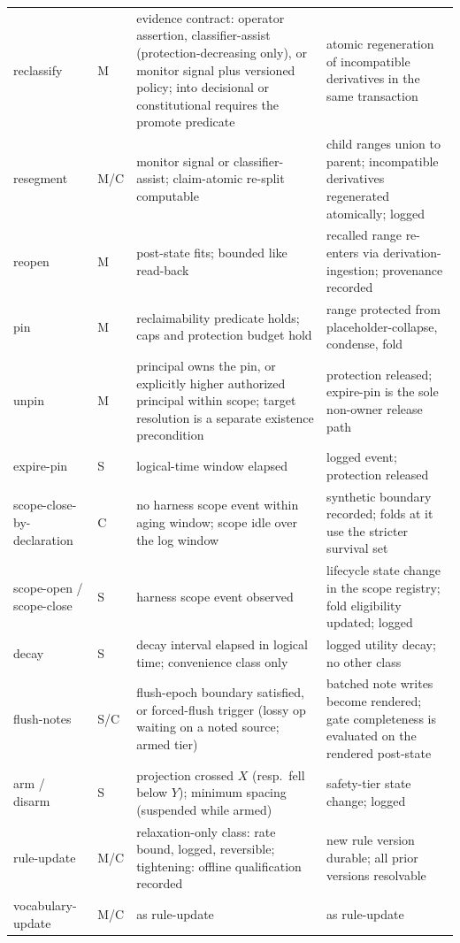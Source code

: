 \documentclass[11pt]{article}
\begin{document}
{\begin{longtable}{@{}p{2.35cm}p{1.15cm}p{4.6cm}p{5.6cm}@{}}
reclassify & M & evidence contract: operator assertion, classifier-assist (protection-decreasing only), or monitor signal plus versioned policy; into decisional or constitutional requires the promote predicate & atomic regeneration of incompatible derivatives in the same transaction \\
resegment & M/C & monitor signal or classifier-assist; claim-atomic re-split computable & child ranges union to parent; incompatible derivatives regenerated atomically; logged \\
reopen & M & post-state fits; bounded like read-back & recalled range re-enters via derivation-ingestion; provenance recorded \\
pin & M & reclaimability predicate holds; caps and protection budget hold & range protected from placeholder-collapse, condense, fold \\
unpin & M & principal owns the pin, or explicitly higher authorized principal within scope; target resolution is a separate existence precondition & protection released; expire-pin is the sole non-owner release path \\
expire-pin & S & logical-time window elapsed & logged event; protection released \\
scope-close-by-declaration & C & no harness scope event within aging window; scope idle over the log window & synthetic boundary recorded; folds at it use the stricter survival set \\
scope-open / scope-close & S & harness scope event observed & lifecycle state change in the scope registry; fold eligibility updated; logged \\
decay & S & decay interval elapsed in logical time; convenience class only & logged utility decay; no other class \\
flush-notes & S/C & flush-epoch boundary satisfied, or forced-flush trigger (lossy op waiting on a noted source; armed tier) & batched note writes become rendered; gate completeness is evaluated on the rendered post-state \\
arm / disarm & S & projection crossed $X$ (resp.\ fell below $Y$); minimum spacing (suspended while armed) & safety-tier state change; logged \\
rule-update & M/C & relaxation-only class: rate bound, logged, reversible; tightening: offline qualification recorded & new rule version durable; all prior versions resolvable \\
vocabulary-update & M/C & as rule-update & as rule-update \\

\end{longtable}}
\end{document}
